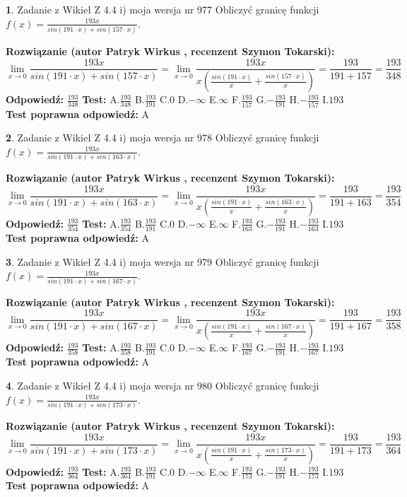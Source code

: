 \documentclass[12pt, a4paper]{article}
\theoremstyle{definition} %
\newtheorem{zad}{}
\newcommand{\zadStart}[1]{\begin{zad}#1\newline}
\newcommand{\zadStop}{\end{zad}}
\newcommand{\rozwStart}[2]{\noindent \textbf{Rozwiązanie (autor #1 , recenzent #2): }\newline}
\newcommand{\rozwStop}{\newline}
\newcommand{\odpStart}{\noindent \textbf{Odpowiedź:}\newline}
\newcommand{\odpStop}{\newline}
\newcommand{\testStart}{\noindent \textbf{Test:}\newline}
\newcommand{\testStop}{\newline}
\newcommand{\kluczStart}{\noindent \textbf{Test poprawna odpowiedź:}\newline}
\newcommand{\kluczStop}{\newline}
\begin{document}
\zadStart{Zadanie z Wikieł Z 4.4 i) moja wersja nr 977}
Obliczyć granicę funkcji $f(x)=\frac{193x}{sin(191\cdot x) +sin(157\cdot x)}$.
\zadStop
\rozwStart{Patryk Wirkus}{Szymon Tokarski}
$$\lim\limits_{x\to 0}\frac{193x}{sin(191\cdot x) +sin(157\cdot x)}=\lim\limits_{x\to 0}\frac{193x}{x(\frac{sin(191\cdot x)}{x}+\frac{sin(157\cdot x)}{x})}=\frac{193}{191+157} = \frac{193}{348}$$
\rozwStop
\odpStart
$\frac{193}{348}$
\odpStop
\testStart
A.$\frac{193}{348}$
B.$\frac{193}{191}$
C.$0$
D.$-\infty$
E.$\infty$
F.$\frac{193}{157}$
G.$-\frac{193}{191}$
H.$-\frac{193}{157}$
I.$193$
\testStop
\kluczStart
A
\kluczStop



\zadStart{Zadanie z Wikieł Z 4.4 i) moja wersja nr 978}
Obliczyć granicę funkcji $f(x)=\frac{193x}{sin(191\cdot x) +sin(163\cdot x)}$.
\zadStop
\rozwStart{Patryk Wirkus}{Szymon Tokarski}
$$\lim\limits_{x\to 0}\frac{193x}{sin(191\cdot x) +sin(163\cdot x)}=\lim\limits_{x\to 0}\frac{193x}{x(\frac{sin(191\cdot x)}{x}+\frac{sin(163\cdot x)}{x})}=\frac{193}{191+163} = \frac{193}{354}$$
\rozwStop
\odpStart
$\frac{193}{354}$
\odpStop
\testStart
A.$\frac{193}{354}$
B.$\frac{193}{191}$
C.$0$
D.$-\infty$
E.$\infty$
F.$\frac{193}{163}$
G.$-\frac{193}{191}$
H.$-\frac{193}{163}$
I.$193$
\testStop
\kluczStart
A
\kluczStop



\zadStart{Zadanie z Wikieł Z 4.4 i) moja wersja nr 979}
Obliczyć granicę funkcji $f(x)=\frac{193x}{sin(191\cdot x) +sin(167\cdot x)}$.
\zadStop
\rozwStart{Patryk Wirkus}{Szymon Tokarski}
$$\lim\limits_{x\to 0}\frac{193x}{sin(191\cdot x) +sin(167\cdot x)}=\lim\limits_{x\to 0}\frac{193x}{x(\frac{sin(191\cdot x)}{x}+\frac{sin(167\cdot x)}{x})}=\frac{193}{191+167} = \frac{193}{358}$$
\rozwStop
\odpStart
$\frac{193}{358}$
\odpStop
\testStart
A.$\frac{193}{358}$
B.$\frac{193}{191}$
C.$0$
D.$-\infty$
E.$\infty$
F.$\frac{193}{167}$
G.$-\frac{193}{191}$
H.$-\frac{193}{167}$
I.$193$
\testStop
\kluczStart
A
\kluczStop



\zadStart{Zadanie z Wikieł Z 4.4 i) moja wersja nr 980}
Obliczyć granicę funkcji $f(x)=\frac{193x}{sin(191\cdot x) +sin(173\cdot x)}$.
\zadStop
\rozwStart{Patryk Wirkus}{Szymon Tokarski}
$$\lim\limits_{x\to 0}\frac{193x}{sin(191\cdot x) +sin(173\cdot x)}=\lim\limits_{x\to 0}\frac{193x}{x(\frac{sin(191\cdot x)}{x}+\frac{sin(173\cdot x)}{x})}=\frac{193}{191+173} = \frac{193}{364}$$
\rozwStop
\odpStart
$\frac{193}{364}$
\odpStop
\testStart
A.$\frac{193}{364}$
B.$\frac{193}{191}$
C.$0$
D.$-\infty$
E.$\infty$
F.$\frac{193}{173}$
G.$-\frac{193}{191}$
H.$-\frac{193}{173}$
I.$193$
\testStop
\kluczStart
A
\kluczStop
\end{document}
